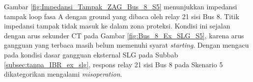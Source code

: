 Gambar \ref{fig:Impedansi_Tampak_ZAG_Bus_8_S5} menunjukkan impedansi tampak loop fasa A dengan ground yang dibaca oleh relay 21 sisi Bus 8. Titik impedansi tampak tidak masuk ke dalam zona proteksi. Kondisi ini sejalan dengan arus sekunder CT pada Gambar \ref{fig:Bus_8_Ex_SLG_S5}, karena arus gangguan yang terbaca masih belum memenuhi syarat \textit{starting}. Dengan mengacu pada kondisi dasar gangguan eksternal SLG pada Subbab \ref{subsec:tanpa_IBR_ex_slg}, respons relay 21 sisi Bus 8 pada Skenario 5 dikategorikan mengalami \textit{misoperation}.







